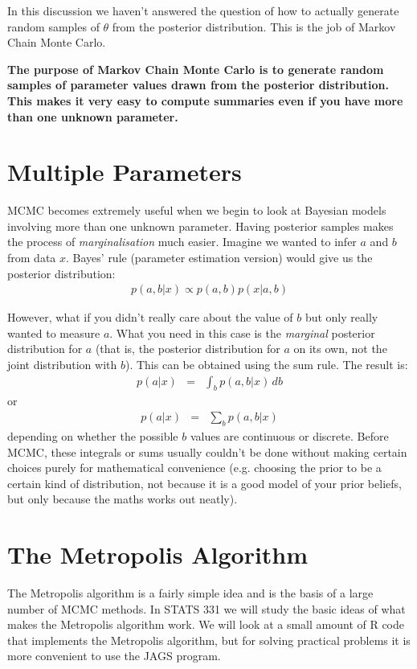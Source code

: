 In this discussion we haven't answered the question of how to actually generate
random samples of $\theta$ from the posterior distribution. This is the job
of Markov Chain Monte Carlo.

\begin{framed}
{\bf
The purpose of Markov Chain Monte Carlo is to generate random samples of
parameter values drawn from the posterior distribution. This makes it very easy
to compute summaries even if you have more than one unknown parameter.}
\end{framed}

\section{Multiple Parameters}
MCMC becomes extremely useful when we begin to look at Bayesian models involving
more than one unknown parameter. 
Having posterior samples makes the process of {\it marginalisation}
much easier. Imagine we wanted to infer $a$ and $b$ from
data $x$. Bayes' rule (parameter estimation version) would give us the posterior
distribution:
\begin{eqnarray}
p(a, b | x) \propto p(a, b)p(x|a,b)
\end{eqnarray}

However, what if you didn't really care about the value of $b$ but
only really wanted to measure $a$. What you need in this case is the
{\it marginal} posterior distribution for $a$ (that is, the posterior
distribution for $a$ on its own, not the joint distribution with $b$).
This can be obtained using the sum rule. The result is:
\begin{eqnarray}
p(a | x) &=& \int_b p(a, b|x) \, db
\end{eqnarray}
or
\begin{eqnarray}
p(a | x) &=& \sum_{b} p(a, b|x)
\end{eqnarray}
depending on whether the possible $b$ values are continuous or discrete.
Before MCMC, these integrals or sums usually couldn't be done without making
certain choices purely for mathematical convenience (e.g. choosing the prior
to be a certain kind of distribution, not because it is a good model of your
prior beliefs, but only because the maths works out neatly).

\section{The Metropolis Algorithm}
The Metropolis algorithm is a fairly simple idea and is the basis of a large
number of MCMC methods. In STATS 331 we will study the basic ideas of what
makes the Metropolis algorithm work. We will look at a small amount of R code
that implements the Metropolis algorithm, but for solving practical problems
it is more convenient to use the JAGS program.

